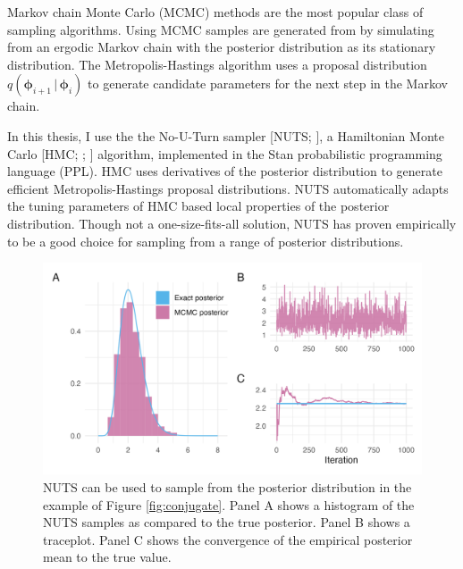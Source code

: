 \documentclass[a4paper, nobind]{templates/ociamthesis}
\begin{document}
Markov chain Monte Carlo (MCMC) methods \autocite{roberts2004general} are the most popular class of sampling algorithms.
Using MCMC samples are generated from by simulating from an ergodic Markov chain with the posterior distribution as its stationary distribution.
The Metropolis-Hastings \autocite{metropolis1953equation,hastings1970monte} algorithm uses a proposal distribution \(q(\boldsymbol{\mathbf{\phi}}_{i + 1} \, | \, \boldsymbol{\mathbf{\phi}}_i)\) to generate candidate parameters for the next step in the Markov chain.

In this thesis, I use the the No-U-Turn sampler {[}NUTS; \textcite{hoffman2014no}{]}, a Hamiltonian Monte Carlo {[}HMC; \textcite{duane1987hybrid}; \textcite{neal2011mcmc}{]} algorithm, implemented in the Stan \autocite{carpenter2017stan} probabilistic programming language (PPL).
HMC uses derivatives of the posterior distribution to generate efficient Metropolis-Hastings proposal distributions.
NUTS automatically adapts the tuning parameters of HMC based local properties of the posterior distribution.
Though not a one-size-fits-all solution, NUTS has proven empirically to be a good choice for sampling from a range of posterior distributions.



\begin{figure}

{\centering \includegraphics[width=0.95\linewidth]{figures/bayesian/stan} 

}

\caption{NUTS can be used to sample from the posterior distribution in the example of Figure \ref{fig:conjugate}. Panel A shows a histogram of the NUTS samples as compared to the true posterior. Panel B shows a traceplot. Panel C shows the convergence of the empirical posterior mean to the true value.}\label{fig:stan}
\end{figure}
\end{document}
